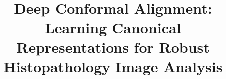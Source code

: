 \documentclass[pdflatex,sn-nature]{sn-jnl}%
\theoremstyle{thmstyleone}%
\theoremstyle{thmstyletwo}%
\theoremstyle{thmstylethree}%
\begin{document}
\makeatletter
\setcounter{topnumber}{4}
\setcounter{bottomnumber}{4}
\setcounter{totalnumber}{6}
\renewcommand{\topfraction}{0.95}
\renewcommand{\bottomfraction}{0.95}
\renewcommand{\textfraction}{0.05}
\renewcommand{\floatpagefraction}{0.6}
\renewcommand{\dbltopfraction}{0.95}
\renewcommand{\dblfloatpagefraction}{0.6}
\makeatother

\title[Deep Conformal Alignment for Histopathology]{Deep Conformal Alignment: Learning Canonical Representations for Robust Histopathology Image Analysis}

\author*[1]{ }

\author[2]{ }


\end{document}
